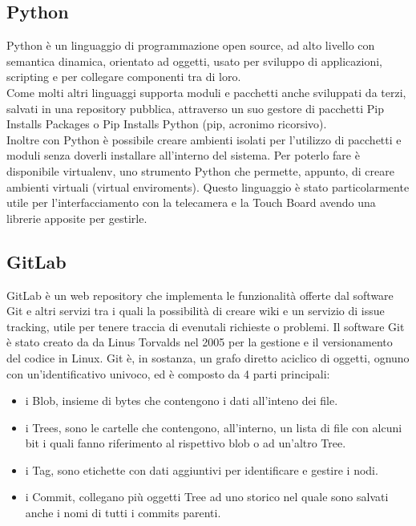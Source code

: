 \subsection{Python}
Python \`e un linguaggio di programmazione open source, ad alto livello con semantica dinamica, orientato ad oggetti, usato
per sviluppo di applicazioni, scripting e per collegare componenti tra di loro.\\[1\baselineskip]
Come molti altri linguaggi supporta moduli e pacchetti anche sviluppati da terzi, salvati in una repository pubblica,
attraverso un suo gestore di pacchetti Pip Installs Packages o Pip Installs Python (pip, acronimo ricorsivo).
\\[1\baselineskip]
Inoltre con Python \`e possibile creare ambienti isolati per l'utilizzo di pacchetti e moduli senza doverli installare all'interno del sistema.
Per poterlo fare \`e disponibile virtualenv, uno strumento Python che permette, appunto, di creare ambienti virtuali (virtual enviroments).
Questo linguaggio \`e stato particolarmente utile per l'interfacciamento con la telecamera e la Touch Board avendo una librerie
apposite per gestirle.
\\[2\baselineskip]

\subsection{GitLab}
GitLab \`e un web repository che implementa le funzionalit\`a offerte dal software Git e altri
servizi tra i quali la possibilit\`a di creare wiki e un servizio di issue tracking, utile per tenere traccia
di evenutali richieste o problemi.
Il software Git \`e stato creato da da Linus Torvalds nel 2005 per la gestione e il versionamento del codice in Linux.
Git \`e, in sostanza, un grafo diretto aciclico di oggetti, ognuno con un'identificativo univoco, ed \`e composto da 4 parti principali:
\begin{itemize}
\item i Blob, insieme di bytes che contengono i dati all'inteno dei file.
\item i Trees, sono le cartelle che contengono, all'interno, un lista di file con alcuni bit i quali fanno riferimento al
rispettivo blob o ad un'altro Tree.
\item i Tag, sono etichette con dati aggiuntivi per identificare e gestire i nodi.
\item i Commit, collegano pi\`u oggetti Tree ad uno storico nel quale sono salvati anche i nomi di tutti i commits parenti.
\end{itemize}
